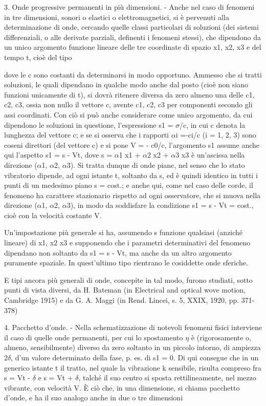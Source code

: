 \documentclass[a4paper]{article}
\begin{document}
3. Onde progressive permanenti in più dimensioni. - Anche nel caso di fenomeni in tre dimensioni, sonori o elastici o elettromagnetici, si è pervenuti alla determinazione di onde, cercando quelle classi particolari di soluzioni (dei sistemi differenziali, o alle derivate parziali, definenti i fenomeni stessi), che dipendono da un unico argomento funzione lineare delle tre coordinate di spazio x1, x2, x3 e del tempo t, cioè del tipo

dove le c sono costanti da determinarsi in modo opportuno. Ammesso che si tratti soluzioni, le quali dipendano in qualche modo anche dal posto (cioè non siano funzioni unicamente di t), si dovrà ritenere diversa da zero almeno una delle c1, c2, c3, ossia non nullo il vettore c, avente c1, c2, c3 per componenti secondo gli assi coordinati. Con ciò si può anche considerare come unico argomento, da cui dipendono le soluzioni in questione, l'espressione s1 = $\sigma$/c, in cui c denota la lunghezza del vettore c; e se si osserva che i rapporti $\alpha$i =-ci/c (i = 1, 2, 3) sono coseni direttori (del vettore c) e si pone V = - c0/c, l'argomento s1 assume anche qui l'aspetto s1 = s - Vt, dove s = $\alpha$1 x1 + $\alpha$2 x2 + $\alpha$3 x3 è un'ascissa nella direzione ($\alpha$1, $\alpha$2, $\alpha$3). Si tratta dunque di onde piane, nel senso che lo stato vibratorio dipende, ad ogni istante t, soltanto da s, ed è quindi identico in tutti i punti di un medesimo piano s = cost.; e anche qui, come nel caso delle corde, il fenomeno ha carattere stazionario rispetto ad ogni osservatore, che si muova nella direzione ($\alpha$1, $\alpha$2, $\alpha$3), in modo da soddisfare la condizione s1 = s - Vt = cost., cioè con la velocità costante V.

Un'impostazione più generale si ha, assumendo s funzione qualsiasi (anziché lineare) di x1, x2 x3 e supponendo che i parametri determinativi del fenomeno dipendano non soltanto da s1 = s - Vt, ma anche da un altro argomento puramente spaziale. In quest'ultimo tipo rientrano le cosiddette onde sferiche.

E tipi ancora più generali di onde, concepite in tal modo, furono studiati, sotto punti di vista diversi, da H. Bateman (in Electrical and optical wove motion, Cambridge 1915) e da G. A. Maggi (in Rend. Lincei, s. 5, XXIX, 1920, pp. 371-378)

4. Pacchetto d'onde. - Nella schematizzazione di notevoli fenomeni fisici interviene il caso di quelle onde permanenti, per cui lo spostamento $\eta$ è (rigorosamente o, almeno, sensibilmente) diverso da zero soltanto in un piccolo intorno, di ampiezza 2$\delta$, d'un valore determinato della fase, p. es. di s1 = 0. Di qui consegue che in un generico istante t il tratto, nel quale la vibrazione k sensibile, risulta compreso fra s = Vt - $\delta$ e s = Vt + $\delta$, talché il suo centro si sposta rettilineamente, nel mezzo vibrante, con velocità V. È ciò che, in una dimensione, si chiama pacchetto d'onde, e ha il suo analogo anche in due o tre dimensioni
\end{document}
